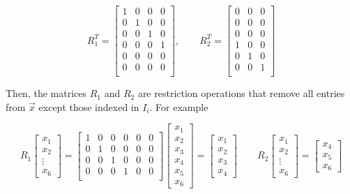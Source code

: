 \begin{equation*}
    R_1^T =
    \begin{bmatrix}
            1 & 0 & 0 & 0 \\
            0 & 1 & 0 & 0 \\
            0 & 0 & 1 & 0 \\
            0 & 0 & 0 & 1 \\
            0 & 0 & 0 & 0 \\
            0 & 0 & 0 & 0 \\
    \end{bmatrix},
    \qquad
    R_2^T =
    \begin{bmatrix}
            0 & 0 & 0 \\
            0 & 0 & 0 \\
            0 & 0 & 0 \\
            1 & 0 & 0 \\
            0 & 1 & 0 \\
            0 & 0 & 1 \\
    \end{bmatrix}
\end{equation*}

Then, the matrices $R_1$ and $R_2$ are restriction operations that remove all entries from $\vec{x}$ except those indexed in $I_i$. For example

\begin{equation*}
    R_1
    \begin{bmatrix}
        x_1\\x_2\\\vdots\\x_6
    \end{bmatrix}
=
\begin{bmatrix}
        1 & 0 & 0 & 0 & 0 & 0\\
        0 & 1 & 0 & 0 & 0 & 0\\
        0 & 0 & 1 & 0 & 0 & 0\\
        0 & 0 & 0 & 1 & 0 & 0\\
\end{bmatrix}
    \begin{bmatrix}
        x_1\\x_2\\x_3\\ x_4\\ x_5 \\x_6
    \end{bmatrix}
    =
    \begin{bmatrix}
        x_1\\x_2\\x_3\\ x_4
    \end{bmatrix}
    \qquad
    R_2
    \begin{bmatrix}
        x_1\\x_2\\\vdots\\x_6
    \end{bmatrix}
    =
    \begin{bmatrix}
        x_4\\x_5\\x_6
    \end{bmatrix}
\end{equation*}

